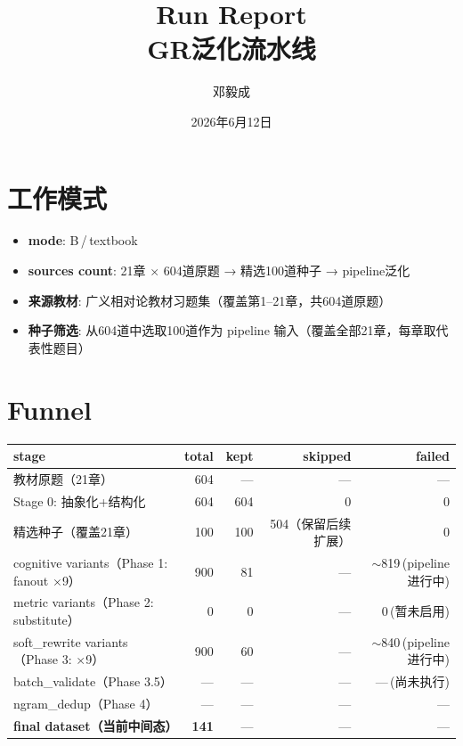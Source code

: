 \documentclass[11pt,a4paper]{article}
\title{\textbf{Run Report} \\ \large GR泛化流水线}
\author{邓毅成}
\date{2026年6月12日}
\begin{document}
\maketitle

\section{工作模式}
\begin{itemize}[nosep]
  \item \textbf{mode}: B\,/\,textbook
  \item \textbf{sources count}: 21章 $\times$ 604道原题 → 精选100道种子 → pipeline泛化
  \item \textbf{来源教材}: 广义相对论教材习题集（覆盖第1--21章，共604道原题）
  \item \textbf{种子筛选}: 从604道中选取100道作为 pipeline 输入（覆盖全部21章，每章取代表性题目）
\end{itemize}

\section{Funnel}

\begin{table}[h]\centering
\begin{tabular}{lrrrr}
\toprule
\textbf{stage} & \textbf{total} & \textbf{kept} & \textbf{skipped} & \textbf{failed} \\
\midrule
教材原题（21章） & 604 & — & — & — \\
Stage 0: 抽象化+结构化 & 604 & 604 & 0 & 0 \\
精选种子（覆盖21章） & 100 & 100 & 504（保留后续扩展） & 0 \\
cognitive variants（Phase 1: fanout $\times$9） & 900 & 81 & — & $\sim$819\,(pipeline进行中) \\
metric variants（Phase 2: substitute） & 0 & 0 & — & 0\,(暂未启用) \\
soft\_rewrite variants（Phase 3: $\times$9） & 900 & 60 & — & $\sim$840\,(pipeline进行中) \\
batch\_validate（Phase 3.5） & — & — & — & —\,(尚未执行) \\
ngram\_dedup（Phase 4） & — & — & — & — \\
\midrule
\textbf{final dataset（当前中间态）} & \textbf{141} & — & — & — \\
\bottomrule
\end{tabular}
\end{table}
\end{document}
